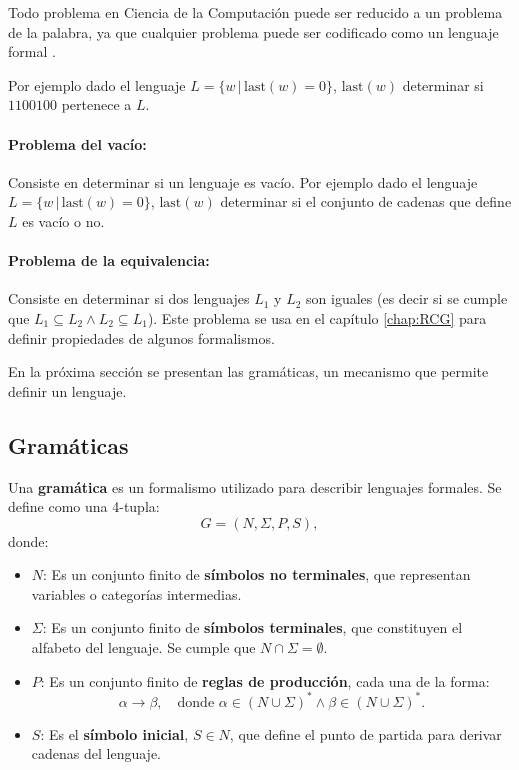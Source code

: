 Todo problema en Ciencia de la Computación puede ser reducido a un problema de la palabra, ya que cualquier problema
puede ser codificado como un lenguaje formal \cite{authomataTheory}. 

Por ejemplo dado el lenguaje $L=\{w\,|\,\text{last}(w)=0\}$, $\text{last}(w)$ determinar si $1100100$ pertenece a $L$.

\paragraph{Problema del vacío:} Consiste en determinar si un lenguaje es vacío. Por ejemplo dado el lenguaje
$L=\{w\,|\,\text{last}(w)=0\}$, $\text{last}(w)$ determinar si el conjunto de cadenas que define $L$ es vacío o no.

\paragraph{Problema de la equivalencia:} Consiste en determinar si dos lenguajes $L_1$ y $L_2$ son iguales (es decir si se cumple que
$L_1\subseteq L_2 \wedge L_2\subseteq L_1$). Este problema se usa en el capítulo \ref{chap:RCG} para definir propiedades de algunos formalismos.

En la próxima sección se presentan las gramáticas, un mecanismo que permite definir un lenguaje.

\subsection{Gramáticas}

Una \textbf{gramática} es un formalismo utilizado para describir lenguajes formales. Se define como una 4-tupla:
\[
      G = (N, \Sigma, P, S),
\]
donde:
\begin{itemize}
      \item \(N\): Es un conjunto finito de \textbf{símbolos no terminales}, que representan variables o categorías intermedias.
      \item \(\Sigma\): Es un conjunto finito de \textbf{símbolos terminales}, que constituyen el alfabeto del lenguaje. Se cumple que \(N \cap \Sigma = \emptyset\).
      \item \(P\): Es un conjunto finito de \textbf{reglas de producción}, cada una de la forma:
            \[
                  \alpha \to \beta, \quad \text{donde } \alpha \in (N \cup \Sigma)^* \wedge \beta \in (N \cup \Sigma)^*.
            \]
      \item \(S\): Es el \textbf{símbolo inicial}, \(S \in N\), que define el punto de partida para derivar cadenas del lenguaje.
\end{itemize}

